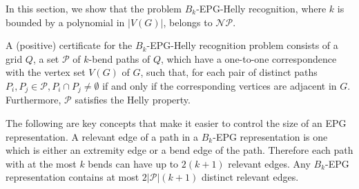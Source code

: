 \documentclass[runningheads]{llncs}
\begin{document}

In this section, we show that the problem $B_k$-EPG-Helly recognition, where $k$ is bounded by a polynomial in $|V(G)|$, belongs to $\mathcal{NP}$. 


A (positive) certificate for the {\sc $B_k$-EPG-Helly recognition} problem consists of a grid $Q$, a set $\mathcal{P}$ of $k$-bend paths of $Q$, which have a one-to-one correspondence with the vertex set $V(G)$ of $G$, such that, for each pair of distinct paths $P_i, P_j\in \mathcal{P}, P_i\cap P_j \neq \emptyset $ if and only if the corresponding vertices are adjacent in $G$. Furthermore, $\mathcal{P}$ satisfies the Helly property.




The following are key concepts that make it easier to control the size of an EPG representation. A relevant edge of a path in a $B_k$-EPG representation is one which is either an extremity edge or a bend edge of the path. Therefore each path with at the most $k$ bends can have up to $2(k + 1)$ relevant edges. Any $B_k$-EPG representation contains at most $2|\mathcal{P}|(k + 1)$ distinct relevant edges. 
\end{document}

